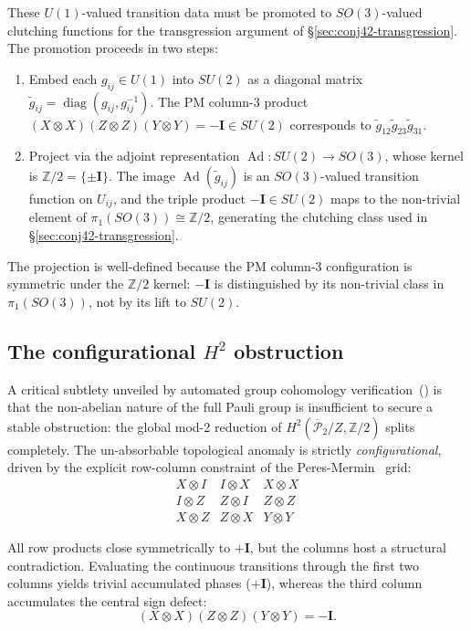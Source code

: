 \documentclass[11pt,a4paper]{article}
\theoremstyle{remark}
\newcommand{\Z}{\mathbb{Z}}
\newcommand{\barPP}{\overline{\mathcal{P}}}
\begin{document}
These $U(1)$-valued transition data must be promoted to
$SO(3)$-valued clutching functions for the transgression argument
of \S\ref{sec:conj42-transgression}.  The promotion proceeds in two
steps:
\begin{enumerate}
  \item Embed each $g_{ij} \in U(1)$ into $SU(2)$ as a diagonal
    matrix $\tilde g_{ij} = \operatorname{diag}(g_{ij}, g_{ij}^{-1})$.
    The PM column-3 product
    $(X \otimes X)(Z \otimes Z)(Y \otimes Y) = -\mathbf{I} \in SU(2)$
    corresponds to $\tilde g_{12} \tilde g_{23} \tilde g_{31}$.
  \item Project via the adjoint representation
    $\operatorname{Ad}: SU(2) \to SO(3)$, whose kernel is $\Z/2
    = \{\pm\mathbf{I}\}$.  The image
    $\operatorname{Ad}(\tilde g_{ij})$ is an $SO(3)$-valued
    transition function on $U_{ij}$, and the triple product
    $-\mathbf{I} \in SU(2)$ maps to the non-trivial element of
    $\pi_1(SO(3)) \cong \Z/2$, generating the clutching class
    used in \S\ref{sec:conj42-transgression}.
\end{enumerate}
The projection is well-defined because the PM column-3 configuration
is symmetric under the $\Z/2$ kernel: $-\mathbf{I}$ is
distinguished by its non-trivial class in $\pi_1(SO(3))$, not by
its lift to $SU(2)$.

\subsection{The configurational $H^2$ obstruction}

A critical subtlety unveiled by automated group cohomology
verification~(\cite{ScriptConj42}) is that the non-abelian nature
of the full Pauli group is insufficient to secure a stable
obstruction: the global mod-2 reduction of
$H^2(\barPP_2/Z, \Z/2)$ splits completely.
The un-absorbable topological anomaly is strictly
\textit{configurational}, driven by the explicit row-column
constraint of the Peres-Mermin~\cite{PeresMermin} grid:
\[
\begin{array}{ccc}
  X \otimes I & I \otimes X & X \otimes X \\
  I \otimes Z & Z \otimes I & Z \otimes Z \\
  X \otimes Z & Z \otimes X & Y \otimes Y
\end{array}
\]

All row products close symmetrically to $+\mathbf{I}$, but the
columns host a structural contradiction. Evaluating the continuous
transitions through the first two columns yields trivial accumulated
phases ($+\mathbf{I}$), whereas the third column accumulates the
central sign defect:
\[
  (X \otimes X)(Z \otimes Z)(Y \otimes Y) = -\mathbf{I}.
\]
\end{document}
